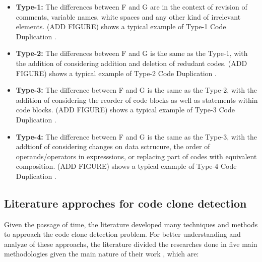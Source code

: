 \begin{itemize}
	\item \textbf{Type-1:} The differences between F and G are in the context of revision of comments, variable names, white spaces and any other kind of irrelevant elements. (ADD FIGURE) shows a typical example of Type-1 Code Duplication \citep{litreview}. 

	\item \textbf{Type-2:} The differences between F and G is the same as the Type-1, with the addition of considering addition and deletion of redudant codes. (ADD FIGURE) shows a typical example of Type-2 Code Duplication \citep{litreview}. 

	\item \textbf{Type-3:} The difference between F and G is the same as the Type-2, with the addition of considering the reorder of code blocks as well as statements within code blocks. (ADD FIGURE) shows a typical example of Type-3 Code Duplication \citep{litreview}. 

	\item \textbf{Type-4:} The difference between F and G is the same as the Type-3, with the addtionf of considering changes on data sctrucure, the order of operands/operators in expresssions, or replacing part of codes with equivalent composition. (ADD FIGURE) shows a typical example of Type-4 Code Duplication \citep{litreview}. 
\end{itemize}

\subsection{Literature approches for code clone detection}

Given the passage of time, the literature developed many techniques and methods to approach the code clone detection problem. 
For better understanding and analyze of these approachs, the literature divided the researches done in
five main methodologies given the main nature of their work \citep{litreview} , which are:

